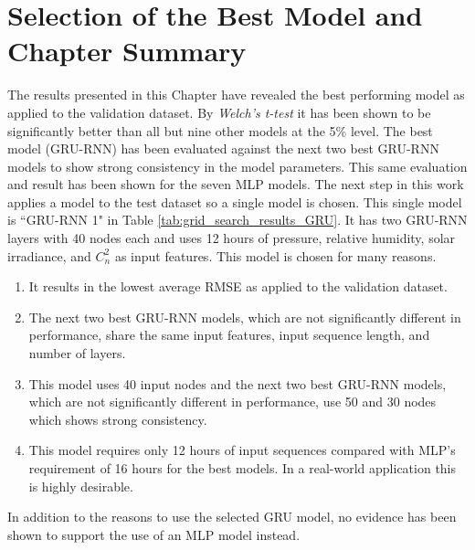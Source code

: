 \section{Selection of the Best Model and Chapter Summary}
The results presented in this Chapter have revealed the best performing model as applied to the validation dataset. By \textit{Welch's t-test} it has been shown to be significantly better than all but nine other models at the 5\% level. The best model (\ac{GRU-RNN}) has been evaluated against the next two best \ac{GRU-RNN} models to show strong consistency in the model parameters. This same evaluation and result has been shown for the seven \ac{MLP} models. The next step in this work applies a model to the test dataset so a single model is chosen. This single model is ``GRU-RNN 1" in Table \ref{tab:grid_search_results_GRU}. It has two \ac{GRU-RNN} layers with 40 nodes each and uses 12 hours of pressure, relative humidity, solar irradiance, and $C_{n}^{2}$ as input features. This model is chosen for many reasons.
\begin{enumerate}
	\item It results in the lowest average RMSE as applied to the validation dataset.
	\item The next two best \ac{GRU-RNN} models, which are not significantly different in performance, share the same input features, input sequence length, and number of layers.
	\item This model uses 40 input nodes and the next two best \ac{GRU-RNN} models, which are not significantly different in performance, use 50 and 30 nodes which shows strong consistency.
	\item This model requires only 12 hours of input sequences compared with \ac{MLP}'s requirement of 16 hours for the best models. In a real-world application this is highly desirable.
\end{enumerate}
In addition to the reasons to use the selected GRU model, no evidence has been shown to support the use of an \ac{MLP} model instead.